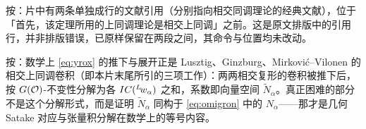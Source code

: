 \begin{yizhu}[易错点]
按：片中有两条单独成行的文献引用（分别指向相交同调理论的经典文献），位于「首先，该定理所用的上同调理论是相交上同调」之前。这是原文排版中的引用行，并非排版错误，已原样保留在两段之间，其命令与位置均未改动。
\end{yizhu}

\begin{yizhu}[含糊点拨]
按：数学上 \eqref{eq:yrox} 的推下与展开正是 Lusztig、Ginzburg、Mirković--Vilonen 的相交上同调卷积（即本片末尾所引的三项工作）：两两相交复形的卷积被推下后，按 $G({\cal O})$-不变性分解为各 $IC({}^L\negthinspace w_\alpha)$ 之和，系数即向量空间 $\tilde N_\alpha$。真正困难的部分不是这个分解形式，而是证明 $\tilde N_\alpha$ 同构于 \eqref{eq:omigron} 中的 $N_\alpha$——那才是几何 Satake 对应与张量积分解在数学上的等号内容。
\end{yizhu}
